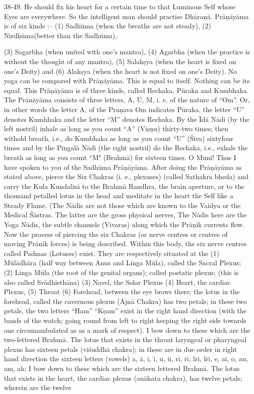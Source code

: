 38-49. He should fix his heart for a certain time to that Luminous Self whose Eyes are everywhere. So the intelligent man should practise Dh\=ara\d{n}\=a. Pr\=a\d{n}\=ay\=ama is of six kinds :-- (1) Sadh\=uma (when the breaths are not steady), (2) Nirdh\=uma(better than the Sadh\=uma),

(3) Sagarbha (when united with one's mantra), (4) Agarbha (when the practice is without the thought of any mantra), (5) Salak\d{s}ya (when the heart is fixed on one's Deity) and (6) Alak\d{s}ya (when the heart is not fixed on one's Deity). No yoga can be compared with Pr\=a\d{n}\=ay\=ama. This is equal to itself. Nothing can be its equal. This Pr\=a\d{n}\=ay\=ama is of three kinds, called Rechaka, P\=uraka and Kumbhaka. The Pr\=an\=ay\=ama consists of three letters, A, U, M, i. e. of the nature of ``Om''. Or, in other words the letter A, of the Pra\d{n}ava Om indicates P\=uraka, the letter ``U'' denotes Kumhhaka and the letter ``M'' denotes Rechaka. By the \=Id\=a N\=adi (by the left nostril) inhale as long as you count ``A'' (Vi\d{s}\d{n}u) thirty-two times; then withold breath, i.e., do Kumbhaka as long as you count ``U'' (\'Siva) sixtyfour times and by the Pingal\=a N\=adi (the right nostril) do the Rechaka, i.e., exhale the breath as long as you count ``M" (Brahm\=a) for sixteen times. O Muni! Thus I have spoken to you of the Sadh\=uma Pr\=a\d{n}\=ay\=ama. After doing the Pr\=a\d{n}\=ay\=ama as stated above, pierce the Six Chakras (i. e., plexuses) (called Sathakra bheda) and carry the Kula Kundalin\={\i} to the Brahm\=a Randhra, the brain aperture, or to the thousand petalled lotus in the head and meditate in the heart the Self like a Steady Flame. (The N\=adis are not those which are known to the Vaidya or the Medical \'S\=astras. The latter are the gross physical nerves, The N\=adis here are the Yoga N\=adis, the subtle channels (Vivaras) along which the Pr\=a\d{n}ik currents flow. Now the process of piercing the six Chakras (or nerve centres or centres of moving Pr\=anik forces) is being described. Within this body, the six nerve centres called Padmas (Lotuses) exist. They are respectively situated at the (1) M\=ul\=adh\=ara (half way between Anus and Linga M\=ula), called the Sacral Plexus; (2) Linga M\=ula (the root of the genital organs); called postatic plexus; (this is also called Sv\=adhisth\=ana) (3) Navel, the Solar Plexus (4) Heart, the cardiac Plexus, (5) Throat (6) Forehead, between the eye brows there; the lotus in the forehead, called the cavernous plexus (\=Ajn\=a Chakra) has two petals; in these two petals, the two letters ``Ham'' ``K\d{s}am'' exist in the right hand direction (with the bands of the watch; going round from left to right keeping the right side towards one circumambulated as as a mark of respect). I bow down to these which are the two-lettered Brahm\=a. The lotus that exists in the throat laryngeal or pharyngeal plexus has sixteen petals (vi\'suddh\=a chakra); in these are in due order in right hand direction the sixteen letters (vowels) a, \=a, i, \={\i}, u, \=u, ri, r\={\i}, lri, lr\={\i}, e, ai, o, au, am, ah; I bow down to these which are the sixteen lettered Brahm\=a. The lotus that exists in the heart, the cardiac plexus (an\=ahata chakra), has twelve petals; wherein are the twelve 